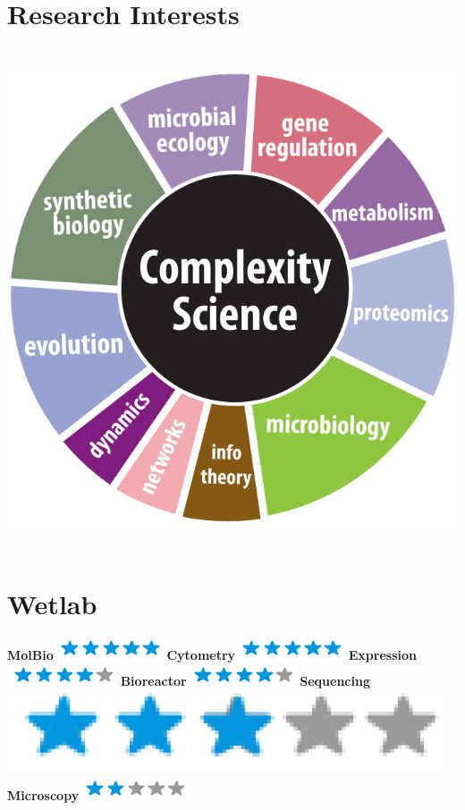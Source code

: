 \documentclass[]{friggeri-cv}
\begin{document}
\begin{aside}
~
~
~
~
~
\section{Research Interests}
     ~
    \includegraphics[scale=0.6]{img/interests.png}
    ~
\section{Wetlab}
    \textbf{MolBio}\includegraphics[scale=0.40]{img/5stars.png}
    \textbf{Cytometry}\includegraphics[scale=0.40]{img/5stars.png}
    \textbf{Expression}\includegraphics[scale=0.40]{img/4stars.png}
    \textbf{Bioreactor}\includegraphics[scale=0.40]{img/4stars.png}
    \textbf{Sequencing}\includegraphics[scale=0.40]{img/3stars.png}
    \textbf{Microscopy}\includegraphics[scale=0.40]{img/2stars.png}
    ~

\end{aside}
\end{document}
